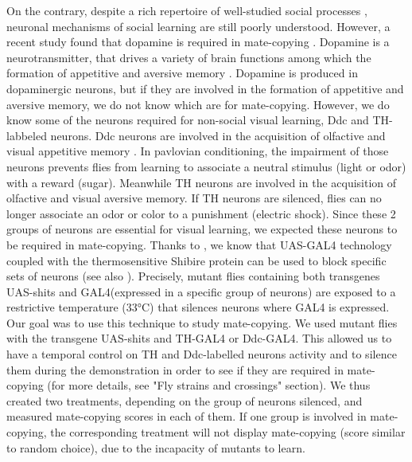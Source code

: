 \documentclass[a4paper, 12pt]{article}
\begin{document}
On the contrary, despite a rich repertoire of well-studied social processes \parencite{pasquaretta_how_2016, teseo_fighting_2016, dawson_social_2018}, neuronal mechanisms of social learning are still poorly understood. However, a recent study found that dopamine is required in mate-copying \parencite{monier_dopamine_2018}. Dopamine is a neurotransmitter, that drives a variety of brain functions among which the formation of appetitive and aversive memory \parencite{riemensperger_punishment_2005, sitaraman_serotonin_2008, alekseyenko_targeted_2010, berry_dopamine_2012, yamamoto_dopamine_2014}. Dopamine is produced in dopaminergic neurons, but if they are involved in the formation of appetitive and aversive memory, we do not know which are for mate-copying. However, we do know some of the neurons required for non-social visual learning, Ddc and TH-labbeled neurons. Ddc neurons are involved in the acquisition of olfactive and visual appetitive memory \parencite{liu_subset_2012, vogt_shared_2014}. In pavlovian conditioning, the impairment of those neurons prevents flies from learning to associate a neutral stimulus (light or odor) with a reward (sugar). Meanwhile TH neurons are involved in the acquisition of olfactive and visual aversive memory. If TH neurons are silenced, flies can no longer associate an odor or color to a punishment (electric shock). Since these 2 groups of neurons are essential for visual learning, we expected these neurons to be required in mate-copying.
Thanks to \textcite{kitamoto_conditional_2001}, we know that UAS-GAL4 technology coupled with the thermosensitive Shibire protein can be used to block specific sets of neurons (see also \textcite{kasuya_neuronal_2009}). Precisely, mutant flies containing both transgenes UAS-shits and GAL4(expressed in a specific group of neurons) are exposed to a restrictive temperature (33°C) that silences neurons where GAL4 is expressed. Our goal was to use this technique to study mate-copying. We used mutant flies with the transgene UAS-shits and TH-GAL4 or Ddc-GAL4. This allowed us to have a temporal control on TH and Ddc-labelled neurons activity and to silence them during the demonstration in order to see if they are required in mate-copying (for more details, see "Fly strains and crossings" section). We thus created two treatments, depending on the group of neurons silenced, and measured mate-copying scores in each of them. If one group is involved in mate-copying, the corresponding treatment will not display mate-copying (score similar to random choice), due to the incapacity of mutants to learn.
	
\end{document}
